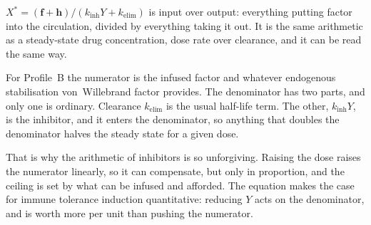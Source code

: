 \begin{reading}
$X^\ast=(\mathbf f+\mathbf h)/(k_{\text{inh}}Y+k_{\text{elim}})$ is input over
output: everything putting factor into the circulation, divided by everything
taking it out. It is the same arithmetic as a steady-state drug concentration,
dose rate over clearance, and it can be read the same way.

For Profile~B the numerator is the infused factor and whatever endogenous
stabilisation von~Willebrand factor provides. The denominator has two parts, and only one is
ordinary. Clearance $k_{\text{elim}}$ is the usual half-life term. The other,
$k_{\text{inh}}Y$, is the inhibitor, and it enters the denominator, so anything
that doubles the denominator halves the steady state for a given dose.

That is why the arithmetic of inhibitors is so unforgiving. Raising the dose
raises the numerator linearly, so it can compensate, but only in proportion,
and the ceiling is set by what can be infused and afforded. The equation makes
the case for immune tolerance induction quantitative: reducing $Y$ acts on the
denominator, and is worth more per unit than pushing the numerator.
\end{reading}

